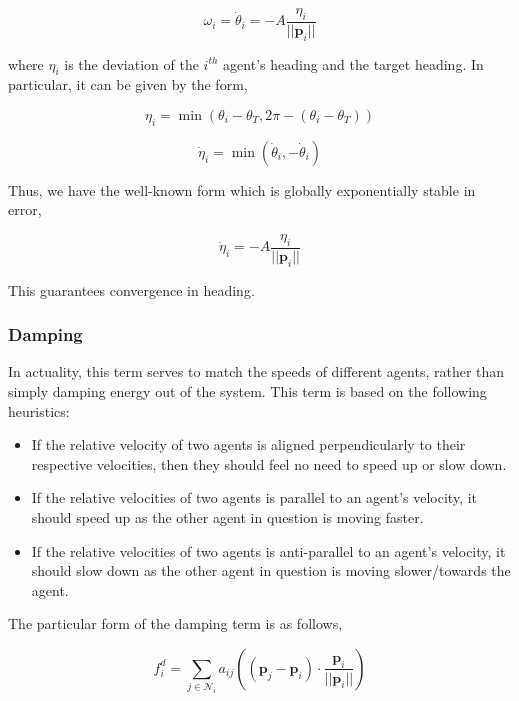 \documentclass[letterpaper, 10 pt, conference]{ieeeconf}  %
\begin{document}
\begin{equation}
    \omega_i = \dot{\theta}_i = -A\frac{\eta_i}{||\mathbf{p}_i||}
\end{equation}

where $\eta_i$ is the deviation of the $i^{th}$ agent's heading and the target heading. In particular, it can be given by the form,

\begin{equation}
    \eta_i = \min(\theta_i - \theta_T, 2\pi - (\theta_i - \theta_T))
\end{equation}

\begin{equation}
    \dot{\eta}_i = \min(\dot{\theta}_i, -\dot{\theta}_i)
\end{equation}

Thus, we have the well-known form which is globally exponentially stable in error,

\begin{equation}
    \dot{\eta}_i = -A\frac{\eta_i}{||\mathbf{p}_i||}
\end{equation}

This guarantees convergence in heading. 

\vspace{5pt}

\subsubsection{Damping}
In actuality, this term serves to match the speeds of different agents, rather than simply damping energy out of the system. This term is based on the following heuristics:

\begin{itemize}
    \item If the relative velocity of two agents is aligned perpendicularly to their respective velocities, then they should feel no need to speed up or slow down. 
    \item If the relative velocities of two agents is parallel to an agent's velocity, it should speed up as the other agent in question is moving faster.
    \item If the relative velocities of two agents is anti-parallel to an agent's velocity, it should slow down as the other agent in question is moving slower/towards the agent.
\end{itemize}

The particular form of the damping term is as follows,

\begin{equation}
    f_i^d = \sum_{j \in \mathcal{N}_i}a_{ij}((\mathbf{p}_j - \mathbf{p}_i)\cdot\frac{\mathbf{p}_i}{||\mathbf{p}_i||}) 
\end{equation}
\end{document}
